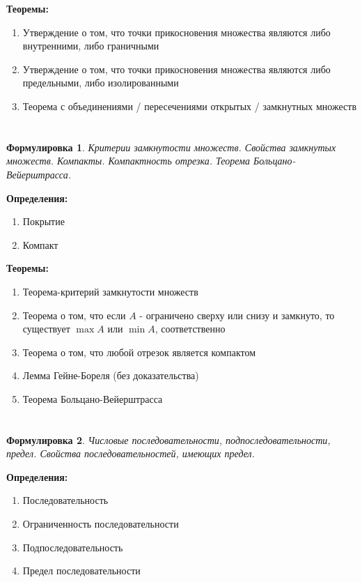 \documentclass[a4paper]{article}
\theoremstyle{plain}
\newtheorem*{st}{Формулировка}
\theoremstyle{definition}
\theoremstyle{remark}
\begin{document}
\textbf{Теоремы:}
\begin{enumerate}
    \item Утверждение о том, что точки прикосновения множества являются либо внутренними, либо граничными
    \item Утверждение о том, что точки прикосновения множества являются либо предельными, либо изолированными
    \item Теорема с объединениями / пересечениями открытых / замкнутных множеств
\end{enumerate}


\section{}
\begin{st}
    Критерии замкнутости множеств. Свойства замкнутых множеств. Компакты. Компактность отрезка. Теорема Больцано-Вейерштрасса.
\end{st}

\textbf{Определения:}
\begin{enumerate}
    \item Покрытие
    \item Компакт
\end{enumerate}

\textbf{Теоремы:}
\begin{enumerate}
    \item Теорема-критерий замкнутости множеств
    \item Теорема о том, что если $A$ - ограничено сверху или снизу и замкнуто, то существует $\max{A}$ или $\min{A}$, соответственно
    \item Теорема о том, что любой отрезок является компактом
    \item Лемма Гейне-Бореля (без доказательства)
    \item Теорема Больцано-Вейерштрасса
\end{enumerate}


\section{}
\begin{st}
    Числовые последовательности, подпоследовательности, предел. Свойства последовательностей, имеющих предел.
\end{st}

\textbf{Определения:}
\begin{enumerate}
    \item Последовательность
    \item Ограниченность последовательности
    \item Подпоследовательность
    \item Предел последовательности
\end{enumerate}
\end{document}
